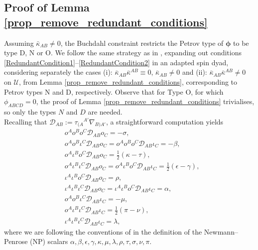 \documentclass[10pt,a4paper]{article}
\theoremstyle{plain}
\begin{document}
\subsection{Proof of Lemma \ref{prop_remove_redundant_conditions}}
\label{Sec:ProofOfProp3}

Assuming $\bar{\kappa}_{AB}\neq 0$, the Buchdahl constraint restricts the Petrov type of
$\bm\phi$ to be type D, N or O.
We follow the same strategy as in \cite{BaeVal10c}, expanding out
conditions \eqref{RedundantCondition1}--\eqref{RedundantCondition2} in an adapted spin dyad, considering separately the cases (i): $\bar{\kappa}_{AB}\bar{\kappa}^{AB}\equiv 0$, $\bar{\kappa}_{AB}\neq 0$
and (ii): $\bar{\kappa}_{AB}\bar{\kappa}^{AB}\neq 0$ on $\mathcal{U}$, from Lemma \ref{prop_remove_redundant_conditions}, corresponding to Petrov types N and D, respectively.
Observe that for Type O, for which $\phi_{ABCD}=0$,
the proof of Lemma \ref{prop_remove_redundant_conditions} trivialises,
so only the types $N$ and $D$ are needed.
\\

Recalling that $\mathcal{D}_{AB}:= \tau_{(A}{}^{A'}\nabla_{B)A'}$, a straightforward computation yields 
\begin{align*}
& o^Ao^Bo^C\mathcal{D}_{AB}o_C = -\sigma,\\
& o^Ao^B\iota^C\mathcal{D}_{AB}o_C=o^Ao^Bo^C\mathcal{D}_{AB}\iota_C=-\beta,\\
& o^A\iota^B o^C\mathcal{D}_{AB}o_C = \tfrac{1}{2}(\kappa - \tau),\\
& o^A\iota^B\iota^C\mathcal{D}_{AB}o_C = o^A\iota^B o^C\mathcal{D}_{AB}\iota_C = \tfrac{1}{2}(\epsilon - \gamma),\\
& \iota^A\iota^B o^C\mathcal{D}_{AB}o_C = \rho,\\
& \iota^A\iota^B\iota^C\mathcal{D}_{AB}o_C = \iota^A\iota^B o^C\mathcal{D}_{AB}\iota_C = \alpha,\\
& o^A o^B\iota^C\mathcal{D}_{AB}\iota_C = -\mu,\\
& o^A\iota^B\iota^C\mathcal{D}_{AB}\iota_C = \tfrac{1}{2}(\pi - \nu),\\
& \iota^A\iota^B\iota^C\mathcal{D}_{AB}\iota_C = \lambda	,
\end{align*}
where we are following the conventions of \cite{PenRin84} in the definition of the Newmann--Penrose (NP) scalars $\alpha, \beta, \epsilon, \gamma, \kappa, \mu, \lambda, \rho, \tau, \sigma, \nu, \pi.$
\\
\end{document}

